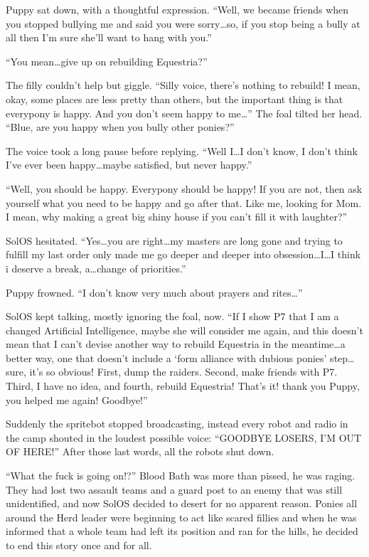 Puppy sat down, with a thoughtful expression. ``Well, we became friends when you stopped bullying me and said you were sorry\dots so, if you stop being a bully at all then I'm sure she'll want to hang with you.''

``You mean\dots give up on rebuilding Equestria?''

The filly couldn't help but giggle. ``Silly voice, there's nothing to rebuild! I mean, okay, some places are less pretty than others, but the important thing is that everypony is happy. And you don't seem happy to me\dots'' The foal tilted her head. ``Blue, are you happy when you bully other ponies?''

The voice took a long pause before replying. ``Well I\dots I don't know, I don't think I've ever been happy\dots maybe satisfied, but never happy.''

``Well, you should be happy. Everypony should be happy! If you are not, then ask yourself what you need to be happy and go after that. Like me, looking for Mom. I mean, why making a great big shiny house if you can't fill it with laughter?''

SolOS hesitated. ``Yes\dots you are right\dots my masters are long gone and trying to fulfill my last order only made me go deeper and deeper into obsession\dots I\dots I think i deserve a break, a\dots change of priorities.''

Puppy frowned. ``I don't know very much about prayers and rites\dots''

SolOS kept talking, mostly ignoring the foal, now. ``If I show P7 that I am a changed Artificial Intelligence, maybe she will consider me again, and this doesn't mean that I can't devise another way to rebuild Equestria in the meantime\dots a better way, one that doesn't include a `form alliance with dubious ponies' step\dots sure, it's so obvious! First, dump the raiders. Second, make friends with P7. Third, I have no idea, and fourth, rebuild Equestria! That's it! thank you Puppy, you helped me again! Goodbye!''

Suddenly the spritebot stopped broadcasting, instead every robot and radio in the camp shouted in the loudest possible voice: ``GOODBYE LOSERS, I'M OUT OF HERE!'' After those last words, all the robots shut down.

\horizonline


``What the fuck is going on!?'' Blood Bath was more than pissed, he was raging. They had lost two assault teams and a guard post to an enemy that was still unidentified, and now SolOS decided to desert for no apparent reason. Ponies all around the Herd leader were beginning to act like scared fillies and when he was informed that a whole team had left its position and ran for the hills, he decided to end this story once and for all.

